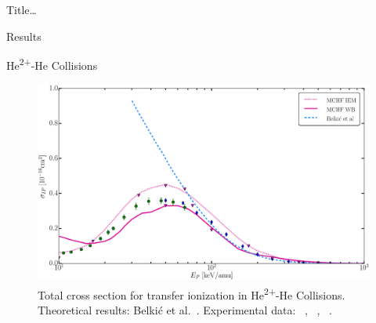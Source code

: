 \documentclass[letterpaper, 11 pt]{report}
\begin{document}
\begin{chapter}{ Title\dots \label{chap:p-he2p-he}}
\begin{section}{Results \label{sec:phe2p-res}}
\begin{subsection}{\texorpdfstring{He\textsuperscript{2+}}{He2+}-He Collisions 
                         \label{sec:he2phe-res}}
         \begin{figure}[t]
            \centering
            \includegraphics[width = 0.95 \linewidth]{./images/he2phe/he2phe-IP.eps}
            \caption[Total cross section for transfer ionization in He\textsuperscript{2+}-He
                     Collisions.]{Total cross section for transfer ionization in
                     He\textsuperscript{2+}-He Collisions. Theoretical results: Belki\'{c}
                     et al.~\cite{BMM-97}.
                     Experimental data: {\color{blue}{$\blacklozenge$}}~\cite{SG85},
                     {\color{OliveGreen}{$\bullet$}}~\cite{SG89},
                     {\color{RedViolet}{$\blacktriangledown$}}~\cite{Dubois87}. \label{fig:he2phe-ip}}
         \end{figure}


\end{subsection}
\end{section}
\end{chapter}
\end{document}

